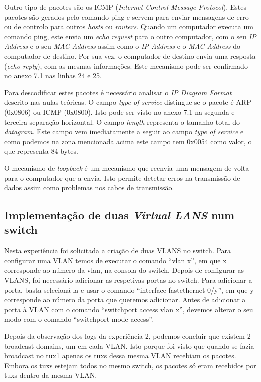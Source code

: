 \documentclass[a4paper]{article}
\begin{document}
Outro tipo de pacotes são os ICMP (\textit{Internet Control Message Protocol}). Estes pacotes são gerados pelo comando ping e servem para enviar mensagens de erro ou de controlo para outros \textit{hosts} ou \textit{routers}. Quando um computador executa um comando ping, este envia um \textit{echo request} para o outro computador, com o seu \textit{IP Address} e o seu \textit{MAC Address} assim como o \textit{IP Address} e o \textit{MAC Address} do computador de destino. Por sua vez, o computador de destino envia uma resposta (\textit{echo reply}), com as mesmas informações. Este mecanismo pode ser confirmado no anexo 7.1 nas linhas 24 e 25.

Para descodificar estes pacotes é necessário analisar o \textit{IP Diagram Format} descrito nas aulas teóricas. O campo \textit{type of service} distingue se o pacote é ARP (0x0806) ou ICMP (0x0800). Isto pode ser visto no anexo 7.1 na segunda e terceira separação horizontal. O campo \textit{length} representa o tamanho total do \textit{datagram}. Este campo vem imediatamente a seguir ao campo \textit{type of service} e como podemos na zona mencionada acima este campo tem 0x0054 como valor, o que representa 84 bytes. 

O mecanismo de \textit{loopback} é um mecanismo que reenvia uma mensagem de volta para o computador que a envia. Isto permite detetar erros na transmissão de dados assim como problemas nos cabos de transmissão.

\subsection{Implementação de duas \textit{Virtual LANS} num switch}
Nesta experiência foi solicitada a criação de duas VLANS no switch. Para configurar uma VLAN temos de executar o comando “vlan x”, em que x corresponde ao número da vlan, na consola do switch. Depois de configurar as VLANS, foi necessário adicionar as respetivas portas no switch. Para adicionar a porta, basta selecioná-la e usar o comando “interface fastethernet 0/y”, em que y corresponde ao número da porta que queremos adicionar. Antes de adicionar a porta à VLAN com o comando “switchport access vlan x”, devemos alterar o seu modo com o comando “switchport mode access”.

Depois da observação dos logs da experiência 2, podemos concluir que existem 2 broadcast domains, um em cada VLAN. Isto porque foi visto que quando se fazia broadcast no tux1 apenas os tuxs dessa mesma VLAN recebiam os pacotes. Embora os tuxs estejam todos no mesmo switch, os pacotes só eram recebidos por tuxs dentro da mesma VLAN.
\end{document}
